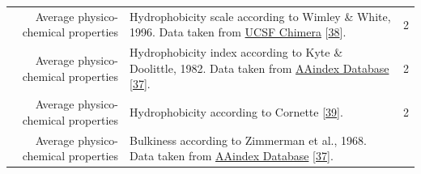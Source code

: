 \documentclass[12pt,a4paper,twoside]{book}
\theoremstyle{definition}
\theoremstyle{definition}
\theoremstyle{remark}
\begin{document}
\begin{longtable}[]{@{}rlc@{}}
\begin{minipage}[t]{0.23\columnwidth}\raggedleft\strut
Average physico-chemical properties\strut
\end{minipage} & \begin{minipage}[t]{0.50\columnwidth}\raggedright\strut
Hydrophobicity scale according to Wimley \& White, 1996. Data taken from
\href{https://www.cgl.ucsf.edu/chimera/docs/ContributedSoftware/defineattrib/wwHydrophobicity.txt}{UCSF
Chimera} {[}\protect\hyperlink{ref-Wimley1996}{38}{]}.\strut
\end{minipage} & \begin{minipage}[t]{0.18\columnwidth}\centering\strut
2\strut
\end{minipage}\tabularnewline
\begin{minipage}[t]{0.23\columnwidth}\raggedleft\strut
Average physico-chemical properties\strut
\end{minipage} & \begin{minipage}[t]{0.50\columnwidth}\raggedright\strut
Hydrophobicity index according to Kyte \& Doolittle, 1982. Data taken
from
\href{http://www.genome.jp/dbget-bin/www_bget?aaindex:KYTJ820101}{AAindex
Database} {[}\protect\hyperlink{ref-Kawashima2008}{37}{]}.\strut
\end{minipage} & \begin{minipage}[t]{0.18\columnwidth}\centering\strut
2\strut
\end{minipage}\tabularnewline
\begin{minipage}[t]{0.23\columnwidth}\raggedleft\strut
Average physico-chemical properties\strut
\end{minipage} & \begin{minipage}[t]{0.50\columnwidth}\raggedright\strut
Hydrophobicity according to Cornette
{[}\protect\hyperlink{ref-Cornette1987}{39}{]}.\strut
\end{minipage} & \begin{minipage}[t]{0.18\columnwidth}\centering\strut
2\strut
\end{minipage}\tabularnewline
\begin{minipage}[t]{0.23\columnwidth}\raggedleft\strut
Average physico-chemical properties\strut
\end{minipage} & \begin{minipage}[t]{0.50\columnwidth}\raggedright\strut
Bulkiness according to Zimmerman et al., 1968. Data taken from
\href{http://www.genome.jp/dbget-bin/www_bget?aaindex:ZIMJ680102}{AAindex
Database} {[}\protect\hyperlink{ref-Kawashima2008}{37}{]}.\strut
\end{minipage} & \begin{minipage}[t]{0.18\columnwidth}\centering\strut

\end{minipage}
\end{longtable}
\end{document}
